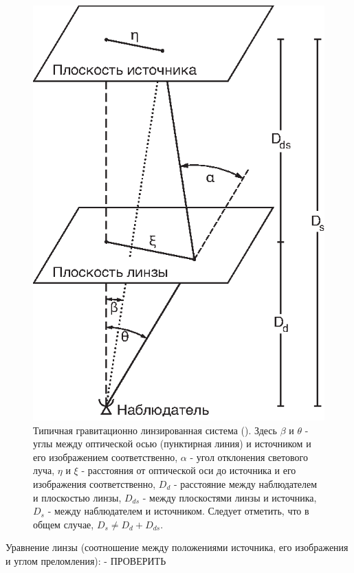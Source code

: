 \begin{figure}[H]
    \centering
	\includegraphics[scale=1.0]{pics/Gravitational_Lensing_Strong_Weak_and_Micro.eps}
	\caption{Типичная гравитационно линзированная система (\cite{gravlensbook}). Здесь $\beta$ и $\theta$ - углы между оптической осью (пунктирная линия) и источником и его изображением соответственно, $\alpha$ - угол отклонения светового луча, $\eta$ и $\xi$ - расстояния от оптической оси до источника и его изображения соответственно,  $D_d$ - расстояние между наблюдателем и плоскостью линзы, $D_{ds}$ - между плоскостями линзы и источника, $D_s$ - между наблюдателем и источником. Следует отметить, что в общем случае, $D_s \neq D_d + D_{ds}$. \label{fig:gravlensfig} }
   \end{figure} 
Уравнение линзы (соотношение между положениями источника, его изображения и углом преломления): - ПРОВЕРИТЬ

